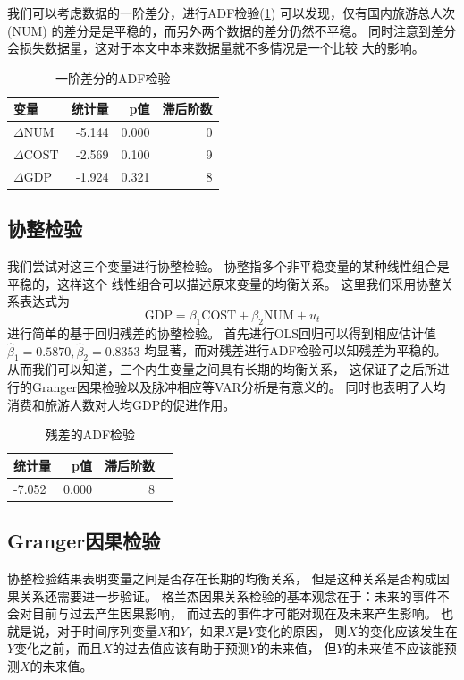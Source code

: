\documentclass{article}
\def\NUM{\mathrm{NUM}}
\def\COST{\mathrm{COST}}
\def\GDP{\mathrm{GDP}}
\begin{document}
    我们可以考虑数据的一阶差分，进行ADF检验(\cref{tab:delta data adf})
    可以发现，仅有国内旅游总人次($\NUM$)
    的差分是是平稳的，而另外两个数据的差分仍然不平稳。
    同时注意到差分会损失数据量，这对于本文中本来数据量就不多情况是一个比较
    大的影响。
    \begin{table}[h]
        \caption{一阶差分的ADF检验}
        \label{tab:delta data adf}
        \centering
        \begin{tabular}{lrrr}
            \toprule
            变量 & 统计量 & p值 & 滞后阶数 \\
            \midrule
            $\Delta\NUM$  & -5.144 & 0.000 & 0 \\
            $\Delta\COST$ & -2.569 & 0.100 & 9 \\
            $\Delta\GDP$  & -1.924 & 0.321 & 8 \\
            \bottomrule
        \end{tabular}
    \end{table}

    \subsection{协整检验}
    我们尝试对这三个变量进行协整检验。
    协整指多个非平稳变量的某种线性组合是平稳的，这样这个
    线性组合可以描述原来变量的均衡关系。
    这里我们采用协整关系表达式为
    \[\GDP = \beta_1\COST + \beta_2\NUM + u_t\]
    进行简单的基于回归残差的协整检验。
    首先进行OLS回归可以得到相应估计值$\hat\beta_1=0.5870,\hat\beta_2=0.8353$
    均显著，而对残差进行ADF检验可以知残差为平稳的。
    从而我们可以知道，三个内生变量之间具有长期的均衡关系，
    这保证了之后所进行的Granger因果检验以及脉冲相应等VAR分析是有意义的。
    同时也表明了人均消费和旅游人数对人均GDP的促进作用。
    \begin{table}[h]
        \caption{残差的ADF检验}
        \label{tab:resid adf}
        \centering
        \begin{tabular}{lrrr}
            \toprule
            统计量 & p值 & 滞后阶数 \\
            \midrule
            -7.052 & 0.000 & 8 \\
            \bottomrule
        \end{tabular}
    \end{table}
    
    \subsection{Granger因果检验}
    协整检验结果表明变量之间是否存在长期的均衡关系，
    但是这种关系是否构成因果关系还需要进一步验证。
    格兰杰因果关系检验的基本观念在于：未来的事件不会对目前与过去产生因果影响，
    而过去的事件才可能对现在及未来产生影响\cite{granger1969investigating,seth2007granger}。
    也就是说，对于时间序列变量$X$和$Y$，如果$X$是$Y$变化的原因，
    则$X$的变化应该发生在$Y$变化之前，而且$X$的过去值应该有助于预测$Y$的未来值，
    但$Y$的未来值不应该能预测$X$的未来值\cite{庞皓2019计量经济学}。
\end{document}

